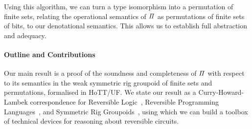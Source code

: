 Using this algorithm, we can turn a type isomorphism into a permutation of finite sets, relating the operational
semantics of $\mathit{\Pi}$ as permutations of finite sets of bits, to our denotational semantics. This allows us to
establish full abstraction and adequacy.

\paragraph{Outline and Contributions} Our main result is a proof of the soundness and completeness of $\mathit{\Pi}$ with
respect to its semantics in the weak symmetric rig groupoid of finite sets and permutations, formalised in HoTT/UF. We
state our result as a Curry-Howard-Lambek correspondence for Reversible
Logic~\cite{sparksSuperstructuralReversibleLogic2014}, Reversible Programming
Languages~\cite{jamesInformationEffects2012}, and Symmetric Rig Groupoids~\cite{laplazaCoherenceDistributivity1972,
kellyCoherenceTheoremsLax1974, caretteComputingSemiringsWeak2016}, using which we can build a toolbox of technical
devices for reasoning about reversible circuits.

